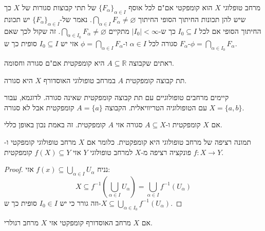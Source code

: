 \documentclass{tstextbook}
\begin{document}
\begin{proposition}
מרחב טופלוגי \(X\) הוא קומפקטי אם"ם לכל אוסף \(\{ F_{\alpha} \}_{\alpha \in I}\) של תתי קבוצות סגורות של \(X\) כך שיש להן תכונות החיתוך הסופי החיתוך \(\bigcap_{\alpha \in I}F_{\alpha}\neq \varnothing\). נאמר של-\(\{ F_{\alpha} \}_{\alpha \in I}\) יש תכונת החיתוך הסופי אם לכל \(I_{0} \subseteq I\) כך ש-\(\lvert I_{0} \rvert<\infty\) מתקיים \(\bigcap_{\alpha \in I_{0}}F_{\alpha }\neq \varnothing\).
זה שקול לכך שאם \(F_{\alpha}\) סגורה לכל \(\alpha \in I\) ו-\(\phi = \bigcap_{\alpha \in I} F_{\alpha}\) אזי יש \(I_{0}\subseteq I\) סופית כך ש-\(\phi=\bigcap_{\alpha \in I_{0}}F_{\alpha}\).

\end{proposition}
\begin{remark}
ראתים שקבוצה \(A\subseteq \mathbb{R}\) היא קומפקטית אם"ם סגורה וחסומה.

\end{remark}
\begin{proposition}
תת קבוצה קומפקטית \(A\) במרחב טופולוגי האוסדורף \(X\) היא סגורה.

\end{proposition}
\begin{remark}
קיימים מרחבים טופולוגיים עם תת קבוצה קומפקטית שאינה סגורה. לדוגמא, עבור \(X=\{ a,b \}\) עם הטופולוגיה הטריוויאלית. הקבוצה \(A=\{ a \}\) קומפקטית אבל לא סגורה.

\end{remark}
\begin{proposition}
אם \(X\) קומפקטית ו-\(A\subseteq X\) סגורה אזי \(A\) קומפקטית. זה באמת נכון באופן כללי.

\end{proposition}
\begin{proposition}
תמונה רציפה של מרחב טופולוגי היא קומפקטית. כלומר אם \(X\) מרחב טופולוגי קומפקטי ו-\(f:X\to Y\) פונקציה רציפה מ-\(X\) למרחב טופולוגי \(Y\) אזי \(f(X)\subseteq Y\) קומפקטית.

\end{proposition}
\begin{proof}
נניח \(f(x)\subseteq \bigcup_{\alpha \in I}U_{\alpha}\) אזי:
$$X\subseteq f^{-1} \left( \bigcup_{\alpha \in I}U_{\alpha} \right)=\bigcup_{\alpha \in I}f^{-1} (U_{\alpha})$$
וזה גורר כי יש \(I_{0} \in I\) סופית כך ש-\(X\subseteq \bigcup_{{\alpha \in I_{0}}}f^{-1}(U_{\alpha})\).

\end{proof}
\begin{proposition}
אם \(X\) מרחב האוסדורף קומפקטי אזי \(X\) מרחב רגולרי.

\end{proposition}
\end{document}
